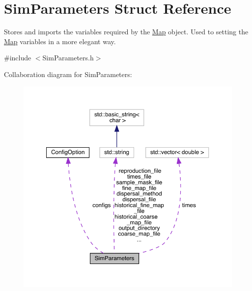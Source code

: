 \hypertarget{struct_sim_parameters}{}\section{Sim\+Parameters Struct Reference}
\label{struct_sim_parameters}


Stores and imports the variables required by the \hyperlink{class_map}{Map} object. Used to setting the \hyperlink{class_map}{Map} variables in a more elegant way.  




{\ttfamily \#include $<$Sim\+Parameters.\+h$>$}



Collaboration diagram for Sim\+Parameters\+:\nopagebreak
\begin{figure}[H]
\begin{center}
\leavevmode
\includegraphics[width=350pt]{struct_sim_parameters__coll__graph}
\end{center}
\end{figure}
